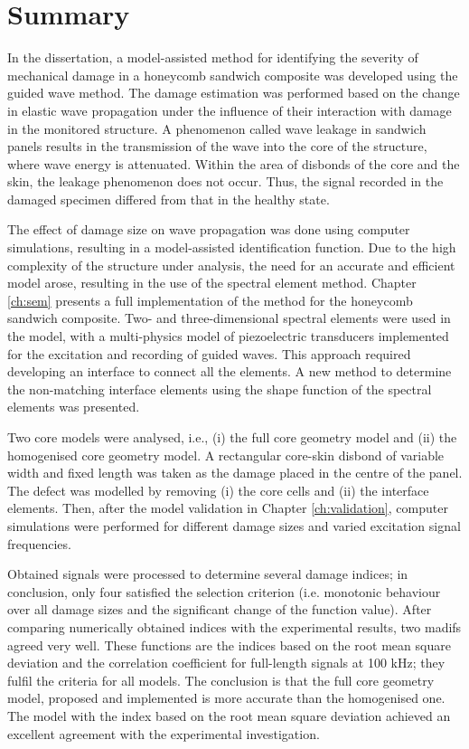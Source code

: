 \documentclass[11pt,a4paper,final]{report}
\theoremstyle{plain}
\begin{document}
\chapter[Summary]{Summary}
\label{ch:summary}

In the dissertation, a model-assisted method for identifying the severity of mechanical damage in a honeycomb sandwich composite was developed using the guided wave method.
The damage estimation was performed based on the change in elastic wave propagation under the influence of their interaction with damage in the monitored structure.
A phenomenon called wave leakage in sandwich panels results in the transmission of the wave into the core of the structure, where wave energy is attenuated.
Within the area of disbonds of the core and the skin, the leakage phenomenon does not occur.
Thus, the signal recorded in the damaged specimen differed from that in the healthy state.

The effect of damage size on wave propagation was done using computer simulations, resulting in a model-assisted identification function.
Due to the high complexity of the structure under analysis, the need for an accurate and efficient model arose, resulting in the use of the spectral element method.
Chapter \ref{ch:sem} presents a full implementation of the method for the honeycomb sandwich composite.
Two- and three-dimensional spectral elements were used in the model, with a multi-physics model of piezoelectric transducers implemented for the excitation and recording of guided waves.
This approach required developing an interface to connect all the elements.
A new method to determine the non-matching interface elements using the shape function of the spectral elements was presented.

Two core models were analysed, i.e., (i) the full core geometry model and (ii) the homogenised core geometry model.
A rectangular core-skin disbond of variable width and fixed length was taken as the damage placed in the centre of the panel.
The defect was modelled by removing (i) the core cells and (ii) the interface elements.
Then, after the model validation in Chapter \ref{ch:validation}, computer simulations were performed for different damage sizes and varied excitation signal frequencies.

Obtained signals were processed to determine several damage indices; in conclusion, only four satisfied the selection criterion (i.e. monotonic behaviour over all damage sizes and the significant change of the function value).
After comparing numerically obtained indices with the experimental results, two \acfp{madif} agreed very well.
These functions are the indices based on the root mean square deviation and the correlation coefficient for full-length signals at 100 \unit{\kHz}; they fulfil the criteria for all models.
The conclusion is that the full core geometry model, proposed and implemented is more accurate than the homogenised one.
The model with the index based on the root mean square deviation achieved an excellent agreement with the experimental investigation.
\end{document}
